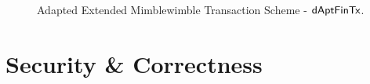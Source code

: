 \begin{landscape}
    \thispagestyle{plain}
    \begin{figure}
        \caption{Adapted Extended Mimblewimble Transaction Scheme - $\mathsf{dAptFinTx}$. \label{fig:inst-apt-mw-tx-fin}}
    \end{figure}
\end{landscape}

\section{Security \& Correctness} \label{sec:atom:security}

